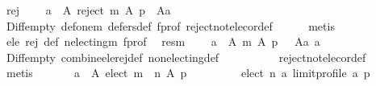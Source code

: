 \begin{isabellebody}
\ rej{\isacharcolon}{\kern0pt}\isanewline
\ \ \ \ {\isachardoublequoteopen}{\isasymexists}a\ {\isasymin}\ A{\isachardot}{\kern0pt}\ reject\ m\ A\ p\ {\isacharequal}{\kern0pt}\ A{\isacharminus}{\kern0pt}{\isacharbraceleft}{\kern0pt}a{\isacharbraceright}{\kern0pt}{\isachardoublequoteclose}\isanewline
\ \ \ \ \isamarkupfalse%
\ Diff{\isacharunderscore}{\kern0pt}empty\ def{\isacharunderscore}{\kern0pt}one{\isacharunderscore}{\kern0pt}m\ defers{\isacharunderscore}{\kern0pt}def\ f{\isacharunderscore}{\kern0pt}prof\ reject{\isacharunderscore}{\kern0pt}not{\isacharunderscore}{\kern0pt}elec{\isacharunderscore}{\kern0pt}or{\isacharunderscore}{\kern0pt}def\isanewline
\ \ \ \ \isamarkupfalse%
\ metis\isanewline
\ \ \isamarkupfalse%
\ ele\ rej\ def\ n{\isacharunderscore}{\kern0pt}electing{\isacharunderscore}{\kern0pt}m\ f{\isacharunderscore}{\kern0pt}prof\ \isamarkupfalse%
\ res{\isacharunderscore}{\kern0pt}m{\isacharcolon}{\kern0pt}\isanewline
\ \ \ \ {\isachardoublequoteopen}{\isasymexists}a\ {\isasymin}\ A{\isachardot}{\kern0pt}\ m\ A\ p\ {\isacharequal}{\kern0pt}\ {\isacharparenleft}{\kern0pt}{\isacharbraceleft}{\kern0pt}{\isacharbraceright}{\kern0pt}{\isacharcomma}{\kern0pt}\ A{\isacharminus}{\kern0pt}{\isacharbraceleft}{\kern0pt}a{\isacharbraceright}{\kern0pt}{\isacharcomma}{\kern0pt}\ {\isacharbraceleft}{\kern0pt}a{\isacharbraceright}{\kern0pt}{\isacharparenright}{\kern0pt}{\isachardoublequoteclose}\isanewline
\ \ \ \ \isamarkupfalse%
\ Diff{\isacharunderscore}{\kern0pt}empty\ combine{\isacharunderscore}{\kern0pt}ele{\isacharunderscore}{\kern0pt}rej{\isacharunderscore}{\kern0pt}def\ non{\isacharunderscore}{\kern0pt}electing{\isacharunderscore}{\kern0pt}def\isanewline
\ \ \ \ \ \ \ \ \ \ reject{\isacharunderscore}{\kern0pt}not{\isacharunderscore}{\kern0pt}elec{\isacharunderscore}{\kern0pt}or{\isacharunderscore}{\kern0pt}def\isanewline
\ \ \ \ \isamarkupfalse%
\ metis\isanewline
\ \ \isamarkupfalse%
\isanewline
\ \ \ \ {\isachardoublequoteopen}{\isasymexists}a\ {\isasymin}\ A{\isachardot}{\kern0pt}\ elect\ {\isacharparenleft}{\kern0pt}m\ {\isasymtriangleright}\ n{\isacharparenright}{\kern0pt}\ A\ p\ {\isacharequal}{\kern0pt}\isanewline
\ \ \ \ \ \ \ \ elect\ n\ {\isacharbraceleft}{\kern0pt}a{\isacharbraceright}{\kern0pt}\ {\isacharparenleft}{\kern0pt}limit{\isacharunderscore}{\kern0pt}profile\ {\isacharbraceleft}{\kern0pt}a{\isacharbraceright}{\kern0pt}\ p{\isacharparenright}{\kern0pt}{\isachardoublequoteclose}\isanewline
\ \ \ \ \isamarkupfalse%

\end{isabellebody}
